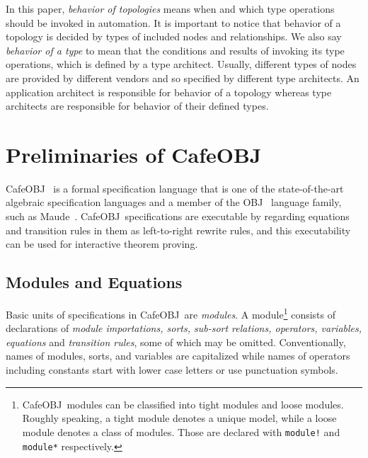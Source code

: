 \documentclass[12pt]{report}
\newcommand{\cafeobj}{{\sf CafeOBJ}~}
\begin{document}
In this paper, {\it behavior of topologies} means when
and which type operations should be invoked in automation. It is
important to notice that behavior of a topology is decided by
types of included nodes and relationships. We also say
{\it behavior of a type} to mean that the conditions and
results of invoking its type operations, which is defined by a type
architect. Usually, different types of nodes are provided by different
vendors and so specified by different type architects. An application
architect is responsible for behavior of a topology
whereas type architects are responsible for behavior of
their defined types.

\chapter{Preliminaries of \cafeobj}
\label{chap:pre}
\cafeobj\cite{cafeobj} is a formal specification language that is one
of the state-of-the-art algebraic specification languages and a member
of the {\sf OBJ}~\cite{OBJ} language family, such as {\sf
  Maude}~\cite{Maude14}.  \cafeobj specifications are executable by
regarding equations and transition rules in them as left-to-right
rewrite rules, and this executability can be used for interactive
theorem proving.

\section{Modules and Equations}
\label{sec:module}
Basic units of specifications in \cafeobj are {\it modules}.  A
module\footnote{\cafeobj modules can be classified into tight modules
  and loose modules. Roughly speaking, a tight module denotes a unique
  model, while a loose module denotes a class of modules. Those are
  declared with {\tt module!} and {\tt module*} respectively.}
consists of declarations of {\it module importations, sorts, sub-sort
  relations, operators, variables, equations} and {\it transition
  rules}, some of which may be omitted. Conventionally, names of
modules, sorts, and variables are capitalized while names of operators
including constants start with lower case letters or use punctuation
symbols.
\end{document}

